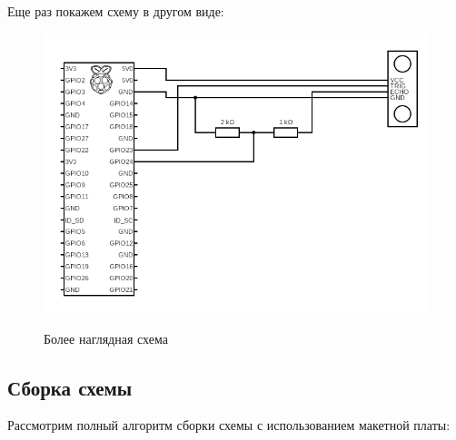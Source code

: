\documentclass[a4paper, 14pt]{article}
\begin{document}
Еще раз покажем схему в другом виде:

\begin{figure}[H]
	\centering
	\includegraphics[width=15cm]{screenshots/5.png}\\
	\caption{Более наглядная схема}
\end{figure}

\subsection{Сборка схемы}

Рассмотрим полный алгоритм сборки схемы с использованием макетной платы:
\end{document}
